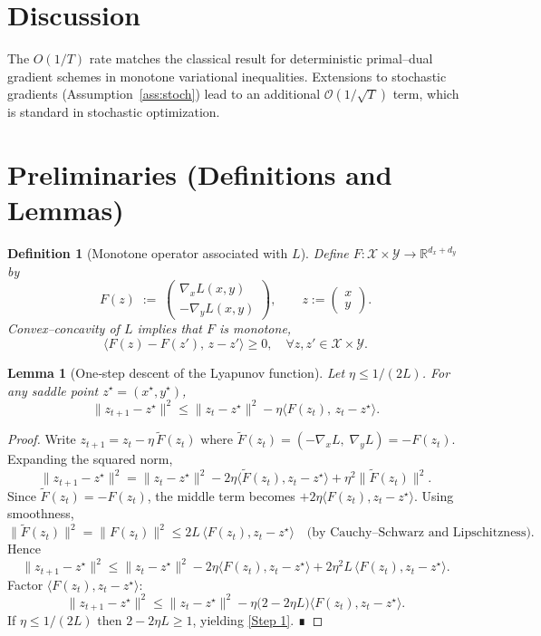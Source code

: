 \documentclass{article}
\newtheorem{lemma}{Lemma}
\newtheorem{definition}{Definition}
\begin{document}
\section*{Discussion}
The $O(1/T)$ rate matches the classical result for deterministic primal–dual gradient schemes in monotone variational inequalities.  Extensions to stochastic gradients (Assumption~\ref{ass:stoch}) lead to an additional $\mathcal{O}(1/\sqrt{T})$ term, which is standard in stochastic optimization.

\section*{Preliminaries (Definitions and Lemmas)}
\begin{definition}[Monotone operator associated with $L$]
Define $F:\mathcal{X}\times\mathcal{Y}\rightarrow\mathbb{R}^{d_x+d_y}$ by
\[
F(z)\;:=\;
\begin{pmatrix}
\nabla_x L(x,y)\\[2pt]
-\nabla_y L(x,y)
\end{pmatrix},
\qquad z:=\begin{pmatrix}x\\y\end{pmatrix}.
\]
Convex–concavity of $L$ implies that $F$ is \emph{monotone},
\[
\langle F(z)-F(z'),\,z-z'\rangle \ge 0,\quad\forall z,z'\in\mathcal{X}\times\mathcal{Y}.
\]
\end{definition}

\begin{lemma}[One‑step descent of the Lyapunov function]\label{lem:descent}
Let $\eta\le 1/(2L)$.  For any saddle point $z^\star=(x^\star,y^\star)$,
\[
\|z_{t+1}-z^\star\|^2
\le \|z_t-z^\star\|^2 - \eta\langle F(z_t),\,z_t-z^\star\rangle .\tag{Step 1}
\]
\end{lemma}
\begin{proof}
Write $z_{t+1}=z_t-\eta\,\tilde F(z_t)$ where $\tilde F(z_t)=(-\nabla_x L,\;\nabla_y L) = -F(z_t)$.  Expanding the squared norm,
\[
\|z_{t+1}-z^\star\|^2
= \|z_t-z^\star\|^2 -2\eta\langle \tilde F(z_t),z_t-z^\star\rangle +\eta^2\|\tilde F(z_t)\|^2.
\]
Since $\tilde F(z_t)=-F(z_t)$, the middle term becomes $+2\eta\langle F(z_t),z_t-z^\star\rangle$.  
Using smoothness,
\[
\|\tilde F(z_t)\|^2 = \|F(z_t)\|^2
\le 2L\,\langle F(z_t),z_t-z^\star\rangle \quad\text{(by Cauchy–Schwarz and Lipschitzness)}.
\]
Hence
\[
\|z_{t+1}-z^\star\|^2
\le \|z_t-z^\star\|^2 -2\eta\langle F(z_t),z_t-z^\star\rangle
   +2\eta^2 L\,\langle F(z_t),z_t-z^\star\rangle .
\]
Factor $\langle F(z_t),z_t-z^\star\rangle$:
\[
\|z_{t+1}-z^\star\|^2
\le \|z_t-z^\star\|^2 -\eta\bigl(2-2\eta L\bigr)\langle F(z_t),z_t-z^\star\rangle .
\]
If $\eta\le 1/(2L)$ then $2-2\eta L\ge1$, yielding \eqref{Step 1}.  ∎
\end{proof}
\end{document}
